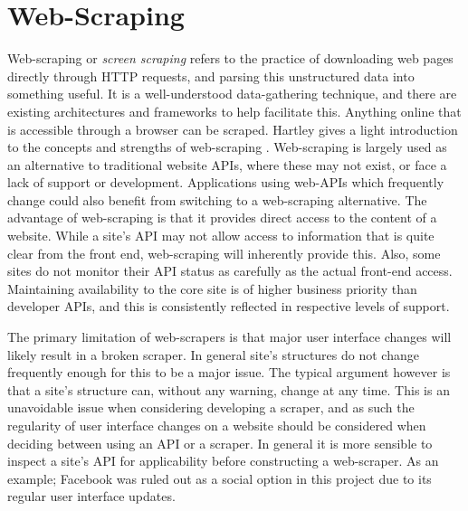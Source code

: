 \section{Web-Scraping}


Web-scraping or \textit{screen scraping} refers to the practice of downloading web pages directly through HTTP requests, and parsing this unstructured data into something useful. It is a well-understood data-gathering technique, and there are existing architectures and frameworks to help facilitate this.  Anything online that is accessible through a browser can be scraped. Hartley gives a light introduction to the concepts and strengths of web-scraping \cite{no_api_for_me}. Web-scraping is largely used as an alternative to traditional website APIs, where these may not exist, or face a lack of support or development. Applications using web-APIs which frequently change could also benefit from switching to a web-scraping alternative. The advantage of web-scraping is that it provides direct access to the content of a website. While a site's API may not allow access to information that is quite clear from the front end, web-scraping will inherently provide this. Also, some sites do not monitor their API 
status 
as carefully as the actual front-end access. Maintaining availability to the core site is of higher business priority than developer APIs, and this is consistently reflected in respective levels of support. 

The primary limitation of web-scrapers is that major user interface changes will likely result in a broken scraper. In general site's structures do not change frequently enough for this to be a major issue. The typical argument however is that a site's structure can, without any warning, change at any time. This is an unavoidable issue when considering developing a scraper, and as such the regularity of user interface changes on a website should be considered when deciding between using an API or a scraper. In general it is more sensible to inspect a site's API for applicability before constructing a web-scraper. As an example; Facebook was ruled out as a social option in this project due to its regular user interface updates. 

